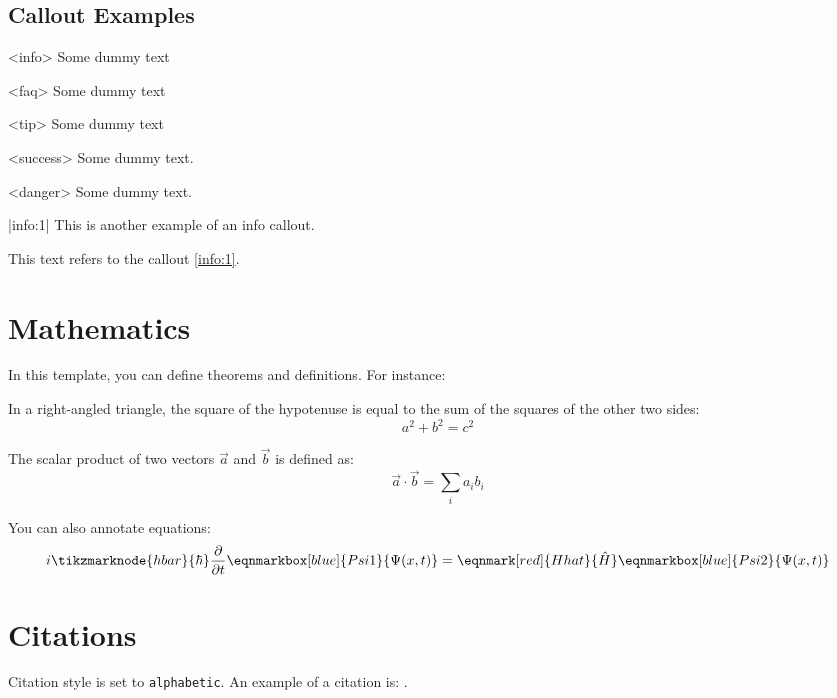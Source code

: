 \documentclass{laxidian}
\begin{document}
    \section{Callout Examples}

    \begin{callout}
        <info>
        Some dummy text
    \end{callout}

    \begin{callout}
        <faq>
        Some dummy text
    \end{callout}

    \begin{callout}
        <tip>
        Some dummy text
    \end{callout}

    \begin{callout}
        <success>
        Some dummy text.
    \end{callout}

    \begin{callout}
        <danger>
        Some dummy text.
    \end{callout}

    \begin{callout}
        |info:1|
        This is another example of an info callout.
    \end{callout}
    This text refers to the callout \ref{info:1}.


    \chapter{Mathematics}

    In this template, you can define theorems and definitions. For instance:

    \begin{theorem}[Pythagoras]
        In a right-angled triangle, the square of the hypotenuse is equal to the sum of the squares of the other two sides:
        \[
            a^2 + b^2 = c^2
        \]
    \end{theorem}

    \begin{definition}
        The scalar product of two vectors \( \vec{a} \) and \( \vec{b} \) is defined as:
        \[
            \vec{a} \cdot \vec{b} = \sum_{i} a_i b_i
        \]
    \end{definition}

    You can also annotate equations: \\
    \vspace{4em}
    \begin{equation*}
        i \tikzmarknode{hbar}{\mathstrut\hbar} \frac{\partial}{\partial t}
        \eqnmarkbox[blue]{Psi1}{\Psi(x, t)} = \eqnmark[red]{Hhat}{\hat{H}}
        \eqnmarkbox[blue]{Psi2}{\Psi(x, t)}
    \end{equation*}


    \chapter{Citations}

    Citation style is set to \texttt{alphabetic}. An example of a citation is: \cite{greenwade1993}.
\end{document}
